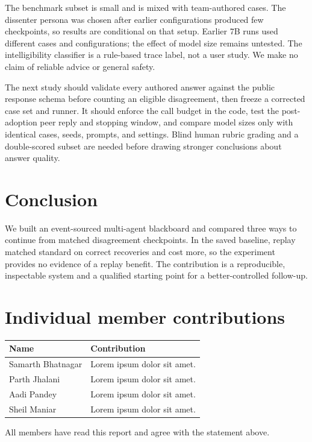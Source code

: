 \documentclass[11pt,a4paper,twocolumn]{article}
\begin{document}
The benchmark subset is small and is mixed with team-authored cases. The dissenter persona was chosen after earlier configurations produced few checkpoints, so results are conditional on that setup. Earlier 7B runs used different cases and configurations; the effect of model size remains untested. The intelligibility classifier is a rule-based trace label, not a user study. We make no claim of reliable advice or general safety.

The next study should validate every authored answer against the public response schema before counting an eligible disagreement, then freeze a corrected case set and runner. It should enforce the call budget in the code, test the post-adoption peer reply and stopping window, and compare model sizes only with identical cases, seeds, prompts, and settings. Blind human rubric grading and a double-scored subset are needed before drawing stronger conclusions about answer quality.

\section{Conclusion}
We built an event-sourced multi-agent blackboard and compared three ways to continue from matched disagreement checkpoints. In the saved baseline, replay matched standard on correct recoveries and cost more, so the experiment provides no evidence of a replay benefit. The contribution is a reproducible, inspectable system and a qualified starting point for a better-controlled follow-up.

\section*{Individual member contributions}
{\small
\begin{tabularx}{\linewidth}{@{}l X@{}}
\toprule
Name & Contribution\\
\midrule
Samarth Bhatnagar & Lorem ipsum dolor sit amet.\\
Parth Jhalani & Lorem ipsum dolor sit amet.\\
Aadi Pandey & Lorem ipsum dolor sit amet.\\
Sheil Maniar & Lorem ipsum dolor sit amet.\\
\bottomrule
\end{tabularx}}

\smallskip
\noindent All members have read this report and agree with the statement above.
\end{document}

